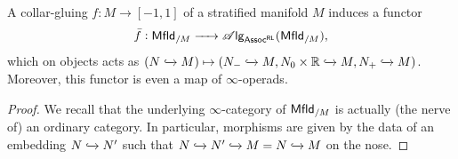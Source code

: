 \documentclass[../text]{subfiles}
\begin{document}
\begin{lemma}\label{lem:fbar_func}
    A collar-gluing $f:M \xrightarrow{} [-1,1]$ of a stratified manifold $M$ induces a functor
    \begin{equation}
        \bar{f}: \mfld[r]_{/M} \xrightarrow{\ \ \ \ } \alg{\mathsf{Assoc^{RL}}} (\mfld[r]_{/M}),
    \end{equation}
    which on objects acts as $(N \xhookrightarrow{} M) \mapsto (N_- \xhookrightarrow{} M, N_0 \times \mathbb{R} \xhookrightarrow{} M, N_+ \xhookrightarrow{} M)$. Moreover, this functor is even a map of $\infty$-operads.
\end{lemma}

\begin{proof}
    We recall that the underlying $\infty$-category of $\mfld[r]_{/M}$ is actually (the nerve of) an ordinary category. In particular, morphisms are given by the data of an embedding $N \xhookrightarrow{} N'$ such that $N \xhookrightarrow{} N' \xhookrightarrow{} M = N \xhookrightarrow{} M$ on the nose.
    

\end{proof}
\end{document}
